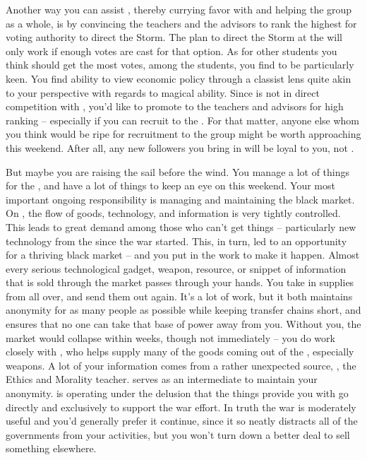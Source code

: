 \documentclass[char]{GL2020}
\begin{document}
Another way you can assist \cChupStudent{}, thereby currying favor with \cChupStudent{\them} and helping the group as a whole, is by convincing the \pTech{} teachers and the \pFarm{} advisors to rank \cChupStudent{\them} the highest for voting authority to direct the Storm. The plan to direct the Storm at the \pSc{} will only work if enough votes are cast for that option. As for other students you think should get the most votes, among the \pShip{} students, you find \cPirateChild{\full} to be particularly keen. You find \cPirateChild{\their} ability to view economic policy through a classist lens quite akin to your perspective with regards to magical ability. Since \cPirateChild{} is not in direct competition with \cChupStudent{}, you'd like to promote \cPirateChild{\them} to the \pFarm{} teachers and \pShip{} advisors for high ranking – especially if you can recruit \cPirateChild{} to the \pGoaties{}. For that matter, anyone else whom you think would be ripe for recruitment to the group might be worth approaching this weekend. After all, any new followers you bring in will be loyal to you, not \cChupLeader{}.

But maybe you are raising the sail before the wind. You manage a lot of things for the \pGoaties{}, and have a lot of things to keep an eye on this weekend. Your most important ongoing responsibility is managing and maintaining the black market. On \pEarth{}, the flow of goods, technology, and information is very tightly controlled. This leads to great demand among those who can't get things -- particularly new technology from the \pTech{} since the war started. This, in turn, led to an opportunity for a thriving black market -- and you put in the work to make it happen. Almost every serious technological gadget, weapon, resource, or snippet of information that is sold through the market passes through your hands. You take in supplies from all over, and send them out again. It's a lot of work, but it both maintains anonymity for as many people as possible while keeping transfer chains short, and ensures that no one can take that base of power away from you. Without you, the market would collapse within weeks, though not immediately -- you do work closely with \cChupInventor{}, who helps supply many of the goods coming out of the \pTech{}, especially weapons. A lot of your information comes from a rather unexpected source, \cEthics{\full}, the Ethics and Morality teacher. \cLibAssist{\full} serves as an intermediate to maintain your anonymity. \cEthics{} is operating under the delusion that the things \cEthics{\they} provide\cEthics{\plural} you with go directly and exclusively to support the \pShip{} war effort. In truth the war is moderately useful and you'd generally prefer it continue, since it so neatly distracts all of the governments from your activities, but you won't turn down a better deal to sell something elsewhere.
\end{document}
